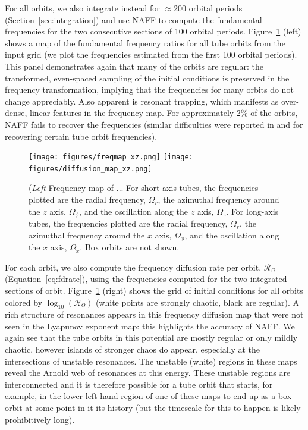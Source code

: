 \documentclass[letterpaper,12pt,preprint]{aastex}
\newcommand{\fdrate}{\mathcal{R}_\Omega}
\begin{document}
For all orbits, we also integrate instead for $\approx$200 orbital periods (Section~\ref{sec:integration}) and use NAFF to compute the fundamental frequencies for the two consecutive sections of 100 orbital periods. Figure~\ref{fig:freqmap} (left) shows a map of the fundamental frequency ratios for all tube orbits from the input grid (we plot the frequencies estimated from the first 100 orbital periods). This panel demonstrates again that many of the orbits are regular: the transformed, even-spaced sampling of the initial conditions is preserved in the frequency transformation, implying that the frequencies for many orbits do not change appreciably. Also apparent is resonant trapping, which manifests as over-dense, linear features in the frequency map. For approximately 2\% of the orbits, NAFF fails to recover the frequencies (similar difficulties were reported in \cite{valluri98} and \cite{papaphilippou96} for recovering certain tube orbit frequencies).

\begin{figure}[h]
\centering
	\texttt{[image: figures/freqmap\_xz.png]}
	\texttt{[image: figures/diffusion\_map\_xz.png]}
	\caption{(\emph{Left} Frequency map of ... For short-axis tubes, the frequencies plotted are the radial frequency, $\Omega_r$, the azimuthal frequency around the $z$ axis, $\Omega_\phi$, and the oscillation along the $z$ axis, $\Omega_z$. For long-axis tubes, the frequencies plotted are the radial frequency, $\Omega_r$, the azimuthal frequency around the $x$ axis, $\Omega_\phi$, and the oscillation along the $x$ axis, $\Omega_x$. Box orbits are not shown.} 
	\label{fig:freqmap}
\end{figure}

For each orbit, we also compute the frequency diffusion rate per orbit, $\fdrate$ (Equation~\ref{eq:fdrate}), using the frequencies computed for the two integrated sections of orbit. Figure~\ref{fig:freqmap} (right) shows the grid of initial conditions for all orbits colored by $\log_{10}(\fdrate)$ (white points are strongly chaotic, black are regular). A rich structure of resonances appears in this frequency diffusion map that were not seen in the Lyapunov exponent map: this highlights the accuracy of NAFF. We again see that the tube orbits in this potential are mostly regular or only mildly chaotic, however islands of stronger chaos do appear, especially at the intersections of unstable resonances. The unstable (white) regions in these maps reveal the Arnold web of resonances at this energy. These unstable regions are interconnected and it is therefore possible for a tube orbit that starts, for example, in the lower left-hand region of one of these maps to end up as a box orbit at some point in it its history (but the timescale for this to happen is likely prohibitively long). 
\end{document}
